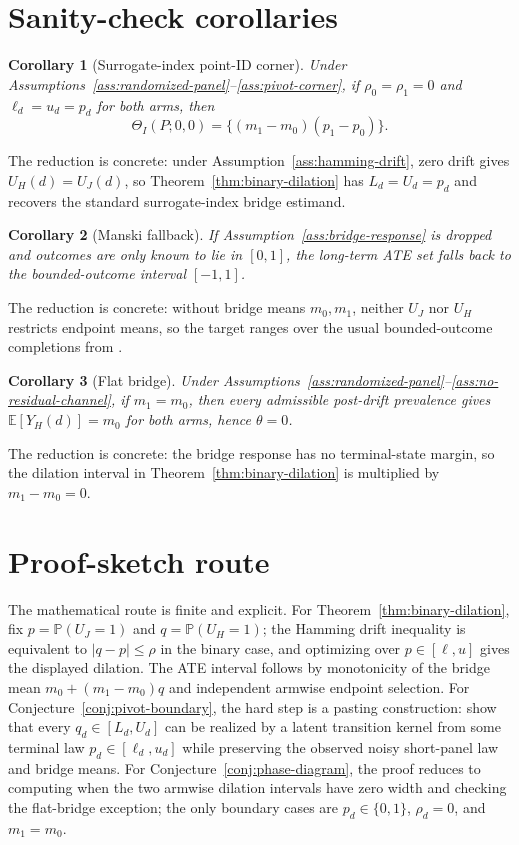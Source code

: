 \documentclass[11pt]{article}
\newcommand{\E}{\mathbb{E}}
\renewcommand{\Pr}{\mathbb{P}}
\theoremstyle{definition}
\theoremstyle{plain}
\newtheorem{corollary}{Corollary}
\theoremstyle{remark}
\begin{document}
\section{Sanity-check corollaries}
\begin{corollary}[Surrogate-index point-ID corner]\label{cor:no-drift}
Under Assumptions~\ref{ass:randomized-panel}--\ref{ass:pivot-corner}, if \(\rho_0=\rho_1=0\) and \(\ell_d=u_d=p_d\) for both arms, then
\[
  \Theta_I(P;0,0)=\{(m_1-m_0)(p_1-p_0)\}.
\]
\end{corollary}
The reduction is concrete: under Assumption~\ref{ass:hamming-drift}, zero drift gives \(U_H(d)=U_J(d)\), so Theorem~\ref{thm:binary-dilation} has \(L_d=U_d=p_d\) and recovers the standard surrogate-index bridge estimand.

\begin{corollary}[Manski fallback]\label{cor:manski}
If Assumption~\ref{ass:bridge-response} is dropped and outcomes are only known to lie in \([0,1]\), the long-term ATE set falls back to the bounded-outcome interval \([-1,1]\).
\end{corollary}
The reduction is concrete: without bridge means \(m_0,m_1\), neither \(U_J\) nor \(U_H\) restricts endpoint means, so the target ranges over the usual bounded-outcome completions from \citet{Manski1990}.

\begin{corollary}[Flat bridge]\label{cor:flat-bridge}
Under Assumptions~\ref{ass:randomized-panel}--\ref{ass:no-residual-channel}, if \(m_1=m_0\), then every admissible post-drift prevalence gives \(\E[Y_H(d)]=m_0\) for both arms, hence \(\theta=0\).
\end{corollary}
The reduction is concrete: the bridge response has no terminal-state margin, so the dilation interval in Theorem~\ref{thm:binary-dilation} is multiplied by \(m_1-m_0=0\).

\section{Proof-sketch route}
The mathematical route is finite and explicit.  For Theorem~\ref{thm:binary-dilation}, fix \(p=\Pr(U_J=1)\) and \(q=\Pr(U_H=1)\); the Hamming drift inequality is equivalent to \(|q-p|\le\rho\) in the binary case, and optimizing over \(p\in[\ell,u]\) gives the displayed dilation.  The ATE interval follows by monotonicity of the bridge mean \(m_0+(m_1-m_0)q\) and independent armwise endpoint selection.  For Conjecture~\ref{conj:pivot-boundary}, the hard step is a pasting construction: show that every \(q_d\in[L_d,U_d]\) can be realized by a latent transition kernel from some terminal law \(p_d\in[\ell_d,u_d]\) while preserving the observed noisy short-panel law and bridge means.  For Conjecture~\ref{conj:phase-diagram}, the proof reduces to computing when the two armwise dilation intervals have zero width and checking the flat-bridge exception; the only boundary cases are \(p_d\in\{0,1\}\), \(\rho_d=0\), and \(m_1=m_0\).
\end{document}
